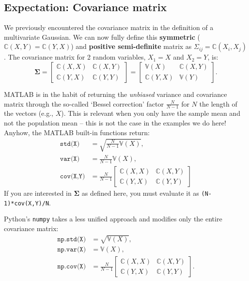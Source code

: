 \documentclass{article}
\begin{document}
\subsection{Expectation: Covariance matrix}
We previously encountered the covariance matrix in the definition of a multivariate Gaussian. We can now fully define this \textbf{symmetric} ($\mathbb{C}(X,Y)=\mathbb{C}(Y,X)$) and \textbf{positive semi-definite} matrix as $\Sigma_{ij}=\mathbb{C}(X_i,X_j)$. The covariance matrix for 2 random variables, $X_1=X$ and $X_2=Y$, is:
\begin{equation}
    \bm{\Sigma} = \left[ \begin{array}{cc} \mathbb{C}(X,X) & \mathbb{C}(X,Y) \\
    \mathbb{C}(Y,X) & \mathbb{C}(Y,Y)\end{array} \right] = \left[ \begin{array}{cc} \mathbb{V}(X) & \mathbb{C}(X,Y) \\
    \mathbb{C}(Y,X) & \mathbb{V}(Y)\end{array} \right].
\end{equation}
\begin{spexample}
    MATLAB is in the habit of returning the \textit{unbiased} variance and covariance matrix through the so-called `Bessel correction' factor $\frac{N}{N-1}$ for $N$ the length of the vectors (e.g., $X$). This is relevant when you only have the sample mean and not the population mean -- this is not the case in the examples we do here! Anyhow, the MATLAB built-in functions return:
    \begin{align}
        \texttt{std(X)} &= \sqrt{\frac{N}{N-1}\mathbb{V}(X)},\\
        \texttt{var(X)} &= \frac{N}{N-1}\mathbb{V}(X),\\
        \texttt{cov(X,Y)}&=\frac{N}{N-1}\left[ \begin{array}{cc} \mathbb{C}(X,X) & \mathbb{C}(X,Y) \\
    \mathbb{C}(Y,X) & \mathbb{C}(Y,Y)\end{array} \right]
    \end{align}
    If you are interested in $\bm{\Sigma}$ as defined here, you must evaluate it as \texttt{(N-1)*cov(X,Y)/N}.
\end{spexample}
\begin{spexample}
    Python's \texttt{numpy} takes a less unified approach and modifies only the entire covariance matrix:
    \begin{align}
        \texttt{np.std(X)}& = \sqrt{\mathbb{V}(X)},\\
        \texttt{np.var(X)}& = \mathbb{V}(X),\\
        \texttt{np.cov(X)}&=\frac{N}{N-1}\left[ \begin{array}{cc} \mathbb{C}(X,X) & \mathbb{C}(X,Y) \\
   \mathbb{C}(Y,X) & \mathbb{C}(Y,Y)\end{array} \right].
    \end{align}
\end{spexample}
\end{document}
